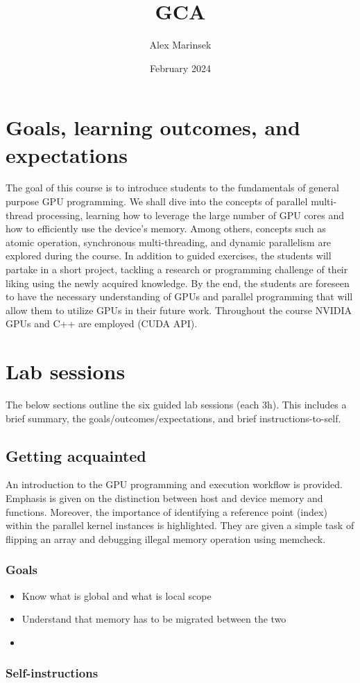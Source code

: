 \documentclass{article}
\title{GCA}
\author{Alex Marinsek}
\date{February 2024}
\begin{document}
\maketitle

\section{Goals, learning outcomes, and expectations}

The goal of this course is to introduce students to the fundamentals of general purpose GPU programming. We shall dive into the concepts of parallel multi-thread processing, learning how to leverage the large number of GPU cores and how to efficiently use the device’s memory. Among others, concepts such as atomic operation, synchronous multi-threading, and dynamic parallelism are explored during the course. In addition to guided exercises, the students will partake in a short project, tackling a research or programming challenge of their liking using the newly acquired knowledge. By the end, the students are foreseen to have the necessary understanding of GPUs and parallel programming that will allow them to utilize GPUs in their future work. Throughout the course NVIDIA GPUs and C++ are employed (CUDA API).


\section{Lab sessions}

The below sections outline the six guided lab sessions (each 3h). This includes a brief summary, the goals/outcomes/expectations, and brief instructions-to-self.


\subsection{Getting acquainted}

An introduction to the GPU programming and execution workflow is provided. Emphasis is given on the distinction between host and device memory and functions. Moreover, the importance of identifying a reference point (index) within the parallel kernel instances is highlighted. They are given a simple task of flipping an array and debugging illegal memory operation using memcheck.


\subsubsection{Goals}
\begin{itemize}
    \item Know what is global and what is local scope
    \item Understand that memory has to be migrated between the two
    \item 
\end{itemize}

\subsubsection{Self-instructions}
\end{document}
